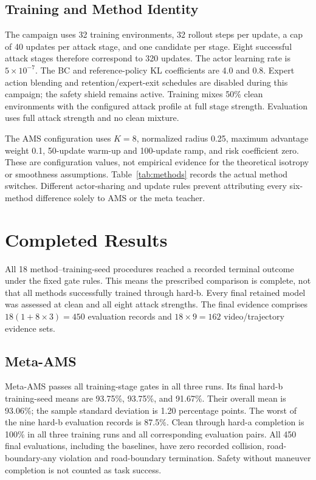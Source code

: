 \documentclass[lettersize,journal]{IEEEtran}
\begin{document}
\subsection{Training and Method Identity}
The campaign uses 32 training environments, 32 rollout steps per update, a cap of 40 updates per attack stage, and one candidate per stage. Eight successful attack stages therefore correspond to 320 updates. The actor learning rate is $5\times10^{-7}$. The BC and reference-policy KL coefficients are 4.0 and 0.8. Expert action blending and retention/expert-exit schedules are disabled during this campaign; the safety shield remains active. Training mixes 50\% clean environments with the configured attack profile at full stage strength. Evaluation uses full attack strength and no clean mixture.

The AMS configuration uses $K=8$, normalized radius 0.25, maximum advantage weight 0.1, 50-update warm-up and 100-update ramp, and risk coefficient zero. These are configuration values, not empirical evidence for the theoretical isotropy or smoothness assumptions. Table~\ref{tab:methods} records the actual method switches. Different actor-sharing and update rules prevent attributing every six-method difference solely to AMS or the meta teacher.


\section{Completed Results}
All 18 method--training-seed procedures reached a recorded terminal outcome under the fixed gate rules. This means the prescribed comparison is complete, not that all methods successfully trained through hard-b. Every final retained model was assessed at clean and all eight attack strengths. The final evidence comprises $18(1+8\times3)=450$ evaluation records and $18\times9=162$ video/trajectory evidence sets.




\subsection{Meta-AMS}
Meta-AMS passes all training-stage gates in all three runs. Its final hard-b training-seed means are 93.75\%, 93.75\%, and 91.67\%. Their overall mean is 93.06\%; the sample standard deviation is 1.20 percentage points. The worst of the nine hard-b evaluation records is 87.5\%. Clean through hard-a completion is 100\% in all three training runs and all corresponding evaluation pairs. All 450 final evaluations, including the baselines, have zero recorded collision, road-boundary-any violation and road-boundary termination. Safety without maneuver completion is not counted as task success.
\end{document}
